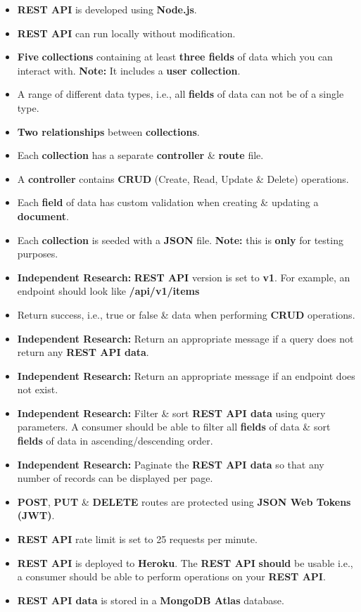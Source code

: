 \documentclass{article}
\begin{document}
\begin{itemize}
	\item \textbf{REST API} is developed using \textbf{Node.js}.
	\item \textbf{REST API} can run locally without modification.
	\item \textbf{Five} \textbf{collections} containing at least \textbf{three fields} of data which you can interact with. \textbf{Note:} It includes a \textbf{user collection}.
	\item A range of different data types, i.e., all \textbf{fields} of data can not be of a single type.
	\item \textbf{Two relationships} between \textbf{collections}.
	\item Each \textbf{collection} has a separate \textbf{controller} \& \textbf{route} file.
	\item A \textbf{controller} contains \textbf{CRUD} (Create, Read, Update \& Delete) operations.
	\item Each \textbf{field} of data has custom validation when creating \& updating a \textbf{document}.
	\item Each \textbf{collection} is seeded with a \textbf{JSON} file. \textbf{Note:} this is \textbf{only} for testing purposes.
	\item \textbf{Independent Research:} \textbf{REST API} version is set to \textbf{v1}. For example, an endpoint should look like \textbf{/api/v1/items}
	\item Return success, i.e., true or false \& data when performing \textbf{CRUD} operations.
	\item \textbf{Independent Research:} Return an appropriate message if a query does not return any \textbf{REST API data}.
	\item \textbf{Independent Research:} Return an appropriate message if an endpoint does not exist.
	\item \textbf{Independent Research:} Filter \& sort \textbf{REST API data} using query parameters. A consumer should be able to filter all \textbf{fields} of data \& sort \textbf{fields} of data in ascending/descending order.
	\item \textbf{Independent Research:} Paginate the \textbf{REST API data} so that any number of records can be displayed per page.
	\item \textbf{POST}, \textbf{PUT} \& \textbf{DELETE} routes are protected using \textbf{JSON Web Tokens (JWT)}.
	\item \textbf{REST API} rate limit is set to 25 requests per minute.
	\item \textbf{REST API} is deployed to \textbf{Heroku}. The \textbf{REST API} \textbf{should} be usable i.e., a consumer should be able to perform operations on your \textbf{REST API}.
	\item \textbf{REST API data} is stored in a \textbf{MongoDB Atlas} database.
\end{itemize}
\end{document}
